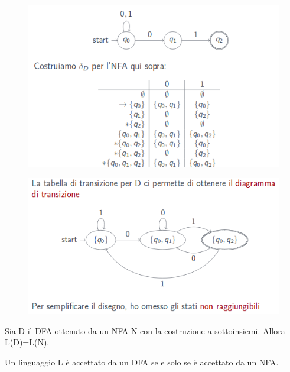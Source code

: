 \begin{figure}[h]
\centering 
\includegraphics[scale=0.5]{Immagini/equivalenza1.png}
\end{figure}

\begin{figure}[h]
\centering 
\includegraphics[scale=0.5]{Immagini/equivalenza2.png}
\end{figure}

\begin{thm}
Sia D il DFA ottenuto da un NFA N con la costruzione a sottoinsiemi. Allora
L(D)=L(N).
\end{thm}

\begin{thm}
Un linguaggio L è accettato da un DFA se e solo se è accettato da un NFA.
\end{thm}



















